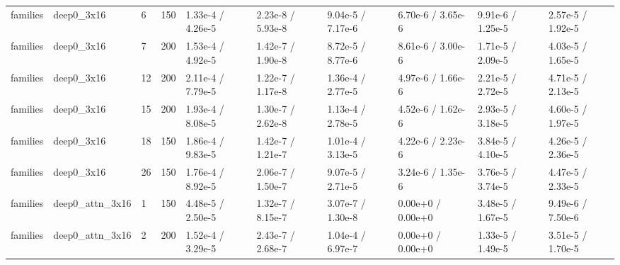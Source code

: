 \documentclass[10pt,a4paper]{article}
\begin{document}
\begin{landscape}
\begin{scriptsize}
\begin{longtable}{llllllllll}
families & deep0\_3x16 & 6 & 150 & 1.33e-4 / 4.26e-5 & 2.23e-8 / 5.93e-8 & 9.04e-5 / 7.17e-6 & 6.70e-6 / 3.65e-6 & 9.91e-6 / 1.25e-5 & 2.57e-5 / 1.92e-5 \\
families & deep0\_3x16 & 7 & 200 & 1.53e-4 / 4.92e-5 & 1.42e-7 / 1.90e-8 & 8.72e-5 / 8.77e-6 & 8.61e-6 / 3.00e-6 & 1.71e-5 / 2.09e-5 & 4.03e-5 / 1.65e-5 \\
families & deep0\_3x16 & 12 & 200 & 2.11e-4 / 7.79e-5 & 1.22e-7 / 1.17e-8 & 1.36e-4 / 2.77e-5 & 4.97e-6 / 1.66e-6 & 2.21e-5 / 2.72e-5 & 4.71e-5 / 2.13e-5 \\
families & deep0\_3x16 & 15 & 200 & 1.93e-4 / 8.08e-5 & 1.30e-7 / 2.62e-8 & 1.13e-4 / 2.78e-5 & 4.52e-6 / 1.62e-6 & 2.93e-5 / 3.18e-5 & 4.60e-5 / 1.97e-5 \\
families & deep0\_3x16 & 18 & 150 & 1.86e-4 / 9.83e-5 & 1.42e-7 / 1.21e-7 & 1.01e-4 / 3.13e-5 & 4.22e-6 / 2.23e-6 & 3.84e-5 / 4.10e-5 & 4.26e-5 / 2.36e-5 \\
families & deep0\_3x16 & 26 & 150 & 1.76e-4 / 8.92e-5 & 2.06e-7 / 1.50e-7 & 9.07e-5 / 2.71e-5 & 3.24e-6 / 1.35e-6 & 3.76e-5 / 3.74e-5 & 4.47e-5 / 2.33e-5 \\
families & deep0\_attn\_3x16 & 1 & 150 & 4.48e-5 / 2.50e-5 & 1.32e-7 / 8.15e-7 & 3.07e-7 / 1.30e-8 & 0.00e+0 / 0.00e+0 & 3.48e-5 / 1.67e-5 & 9.49e-6 / 7.50e-6 \\
families & deep0\_attn\_3x16 & 2 & 200 & 1.52e-4 / 3.29e-5 & 2.43e-7 / 2.68e-7 & 1.04e-4 / 6.97e-7 & 0.00e+0 / 0.00e+0 & 1.33e-5 / 1.49e-5 & 3.51e-5 / 1.70e-5 \\
\bottomrule \end{longtable}
\end{scriptsize}
\end{landscape}
\end{document}
